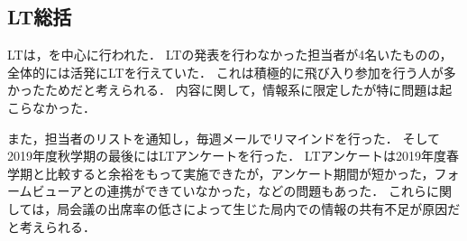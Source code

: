 \subsection*{LT総括}

LTは，\firstGrade{}を中心に行われた．
LTの発表を行わなかった担当者が4名いたものの，全体的には活発にLTを行えていた．
これは積極的に飛び入り参加を行う人が多かったためだと考えられる．
内容に関して，情報系に限定したが特に問題は起こらなかった．

また，担当者のリストを通知し，毎週メールでリマインドを行った．
そして2019年度秋学期の最後にはLTアンケートを行った．
LTアンケートは2019年度春学期と比較すると余裕をもって実施できたが，アンケート期間が短かった，フォームビューアとの連携ができていなかった，などの問題もあった．
これらに関しては，局会議の出席率の低さによって生じた局内での情報の共有不足が原因だと考えられる．
